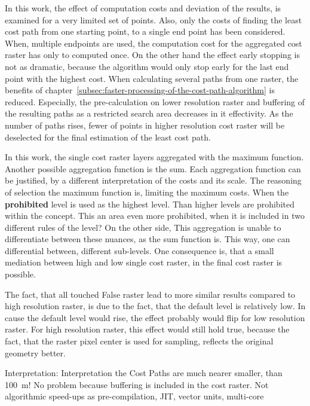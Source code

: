 In this work, the effect of computation costs and deviation of the results, is examined for a very limited set of points.
Also, only the costs of finding the least cost path from one starting point, to a single end point has been considered.
When, multiple endpoints are used, the computation cost for the aggregated cost raster has only to computed once.
On the other hand the effect early stopping is not as dramatic, because the algorithm would only stop early for the last end point with the highest cost.
When calculating several paths from one raster, the benefits of chapter~\ref{subsec:faster-processing-of-the-cost-path-algorithm} is reduced.
Especially, the pre-calculation on lower resolution raster and buffering of the resulting paths as a restricted search area decreases in it effectivity.
As the number of paths rises, fewer of points in higher resolution cost raster will be deselected for the final estimation of the least cost path.

In this work, the single cost raster layers aggregated with the maximum function. 
Another possible aggregation function is the sum.
Each aggregation function can be justified, by a different interpretation of the costs and its scale.
The reasoning of selection the maximum function is, limiting the maximum costs.
When the \textbf{prohibited} level is used as the highest level.
Than higher levels are prohibited within the concept.
This an area even more prohibited, when it is included in two different rules of the level?
On the other side, This aggregation is unable to differentiate between these nuances, as  the sum function is.
This way, one can differential between, different sub-levels.
One consequence is, that a small mediation between high and low single cost raster, in the final cost raster is possible.

The fact, that all touched False raster lead to more similar results compared to high resolution raster, is due to the fact, that the default level is relatively low.
In cause the default level would rise, the effect probably would flip for low resolution raster.
For high resolution raster, this effect would still hold true, because the fact, that the raster pixel center is used for sampling, reflects the original geometry better.


Interpretation: Interpretation the Cost Paths are much nearer smaller, than 100~m!
No problem because buffering is included in the cost raster.
Not algorithmic speed-ups as pre-compilation, JIT, vector units, multi-core